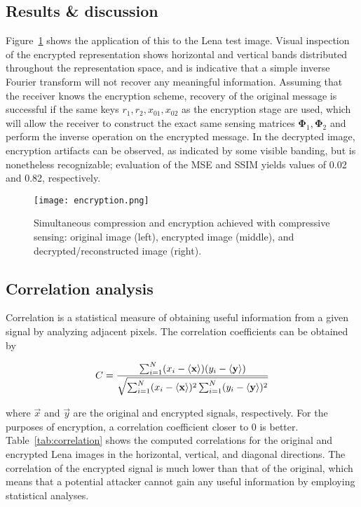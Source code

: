 \subsection{Results \& discussion}
\label{ssec:image-encrypt-rnd}
Figure~\ref{fig:encryption} shows the application of this to the Lena test image. Visual inspection of the encrypted representation shows horizontal and vertical bands distributed throughout the representation space, and is indicative that a simple inverse Fourier transform will not recover any meaningful information. Assuming that the receiver knows the encryption scheme, recovery of the original message is successful if the same keys $r_1, r_2, x_{01}, x_{02}$ as the encryption stage are used, which will allow the receiver to construct the exact same sensing matrices $\bm\Phi_1, \bm\Phi_2$ and perform the inverse operation on the encrypted message. In the decrypted image, encryption artifacts can be observed, as indicated by some visible banding, but is nonetheless recognizable; evaluation of the MSE and SSIM yields values of 0.02 and 0.82, respectively.

\begin{figure}[htb]
	\texttt{[image: encryption.png]}
	\caption{Simultaneous compression and encryption achieved with compressive sensing: original image (left), encrypted image (middle), and decrypted/reconstructed image (right).}
	\label{fig:encryption}
\end{figure}

\subsection{Correlation analysis}
\label{ssec:image-encrypt-correlation}
Correlation is a statistical measure of obtaining useful information from a given signal by analyzing adjacent pixels. The correlation coefficients can be obtained by

\begin{equation}
\label{eq:correlation-coeff}
C = \frac{\sum_{i=1}^N (x_i - \ev{\vec{x}}) (y_i - \ev{\vec{y}})}{\sqrt{\sum_{i=1}^N (x_i - \ev{\vec{x}})^2 \sum_{i=1}^N (y_i - \ev{\vec{y}})^2}}
\end{equation}

\noindent where $\vec{x}$ and $\vec{y}$ are the original and encrypted signals, respectively. For the purposes of encryption, a correlation coefficient closer to 0 is better. Table~\ref{tab:correlation} shows the computed correlations for the original and encrypted Lena images in the horizontal, vertical, and diagonal directions. The correlation of the encrypted signal is much lower than that of the original, which means that a potential attacker cannot gain any useful information by employing statistical analyses.

